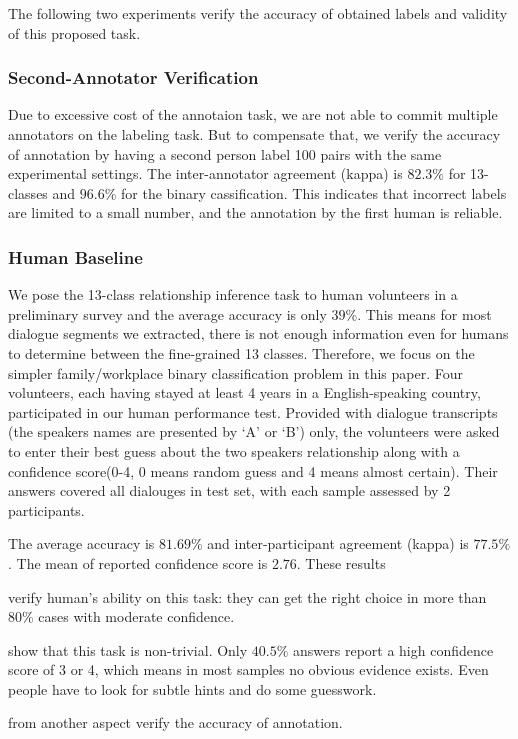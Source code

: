 The following two experiments verify the accuracy of obtained 
labels and validity of this proposed task.

\subsubsection*{Second-Annotator Verification}
Due to excessive cost of the annotaion task, 
we are not able to commit multiple annotators on the labeling task. 
But to compensate that, we verify the accuracy of annotation by 
having a second person label 100 pairs with the same experimental settings. 
The inter-annotator agreement (kappa) is $82.3\%$ for 13-classes and $96.6\%$ for 
the binary cassification. 
This indicates that incorrect labels are limited to a small number, and the annotation by the first human is 
reliable.

\subsubsection*{Human Baseline}
We pose the 13-class relationship inference task to human volunteers in a preliminary survey and the average accuracy is only $39\%$. This means for most dialogue segments we extracted, there is not enough information even for humans to determine between the fine-grained 13 classes. 
Therefore, we focus on the simpler family/workplace binary 
classification problem in this paper. 
Four volunteers, each having stayed at least 4 years in a English-speaking 
country, participated in our human performance test. 
Provided with dialogue transcripts (the speakers 
names are presented by `A' or `B') only, the volunteers were asked to 
enter their best guess about the two speakers relationship along with 
a confidence score(0-4, 0 means random guess and 4 means almost certain). 
Their answers covered all dialouges in test set, 
with each sample assessed by 2 participants.

The average accuracy is $81.69\%$ and  
inter-participant agreement (kappa) is $77.5\%$. 
The mean of reported confidence score is $2.76$. These results 
\begin{compactenum}
	\item verify human's ability on this task: they can get the right choice in more than $80\%$ cases with moderate confidence.
	\item show that this task is non-trivial. Only $40.5\%$ answers report a high confidence score of 3 or 4, 
	which means in most samples no obvious evidence exists.
	Even people have to look for subtle hints and do some guesswork.
	\item from another aspect verify the accuracy of annotation.
\end{compactenum}


